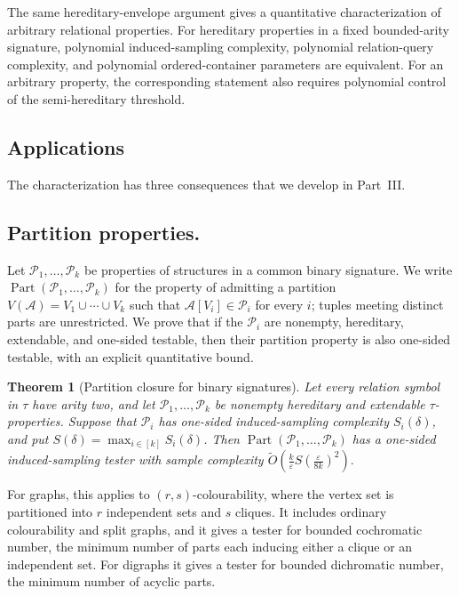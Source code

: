 \documentclass[11pt,reqno,letterpaper]{amsart}
\newcommand{\Part}{\operatorname{Part}}
\newcommand{\cA}{{\mathcal A}}
\newcommand{\cP}{{\mathcal P}}
\theoremstyle{plain}
\newtheorem{thm}{Theorem}[section]
\theoremstyle{remark}
\begin{document}
The same hereditary-envelope argument gives a quantitative characterization
of arbitrary relational properties.  For hereditary properties in a fixed
bounded-arity signature, polynomial induced-sampling complexity, polynomial
relation-query complexity, and polynomial ordered-container parameters are
equivalent.  For an arbitrary property, the corresponding statement also
requires polynomial control of the semi-hereditary threshold.

\subsection{Applications}

The characterization has three consequences that we develop in Part~III.

\subsection*{Partition properties.}
Let $\cP_1,\dots,\cP_k$ be properties of structures in a common binary
signature.  We write $\Part(\cP_1,\dots,\cP_k)$ for the property of admitting a
partition $V(\cA)=V_1\cup\cdots\cup V_k$ such that
$\cA[V_i]\in\cP_i$ for every $i$; tuples meeting distinct parts are
unrestricted.  We prove that if the $\cP_i$ are nonempty, hereditary,
extendable, and one-sided testable, then their partition property is also
one-sided testable, with an explicit quantitative bound.

\begin{thm}[Partition closure for binary signatures]
\label{thm:relational-partition-closure-intro}
Let every relation symbol in $\tau$ have arity two, and let
$\cP_1,\dots,\cP_k$ be nonempty hereditary and extendable $\tau$-properties.
Suppose that $\cP_i$ has one-sided induced-sampling complexity $S_i(\delta)$,
and put $S(\delta)=\max_{i\in[k]}S_i(\delta)$.  Then
$\Part(\cP_1,\dots,\cP_k)$ has a one-sided induced-sampling tester with sample
complexity
\(\widetilde O\!\left( \frac{k}{\varepsilon} S\!\left(\frac{\varepsilon}{8k}\right)^2 \right).\)
\end{thm}

For graphs, this applies to $(r,s)$-colourability, where the vertex set is
partitioned into $r$ independent sets and $s$ cliques.  It includes ordinary
colourability and split graphs, and it gives a tester for bounded cochromatic
number, the minimum number of parts each inducing either a clique or an
independent set.  For digraphs it gives a tester for bounded dichromatic
number, the minimum number of acyclic parts.
\end{document}
